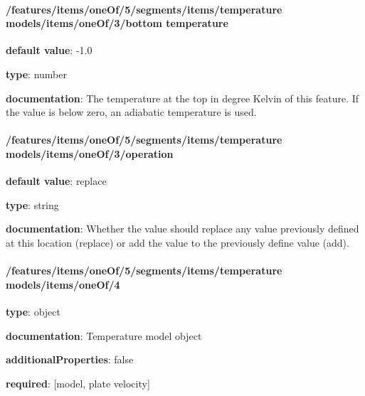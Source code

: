 \begin{itemized}
\end{itemized}\paragraph{/features/items/oneOf/5/segments/items/temperature models/items/oneOf/3/bottom temperature} \begin{itemized}
\item {\bf default value}: -1.0
\item {\bf type}: number
\item {\bf documentation}: The temperature at the top in degree Kelvin of this feature. If the value is below zero, an adiabatic temperature is used.
\end{itemized}\paragraph{/features/items/oneOf/5/segments/items/temperature models/items/oneOf/3/operation} \begin{itemized}
\item {\bf default value}: replace
\item {\bf type}: string
\item {\bf documentation}: Whether the value should replace any value previously defined at this location (replace) or add the value to the previously define value (add).
\end{itemized}\paragraph{/features/items/oneOf/5/segments/items/temperature models/items/oneOf/4} \begin{itemized}
\item {\bf type}: object
\item {\bf documentation}: Temperature model object
\item {\bf additionalProperties}: false
\item {\bf required}: [model, plate velocity]\end{itemized}
